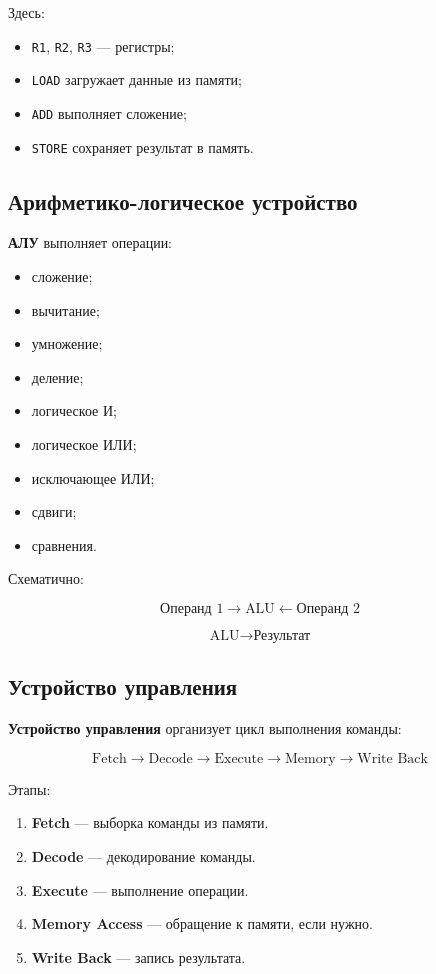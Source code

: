 \documentclass[12pt,a4paper]{article}
\theoremstyle{remark}
\begin{document}
Здесь:
\begin{itemize}
    \item \texttt{R1}, \texttt{R2}, \texttt{R3} --- регистры;
    \item \texttt{LOAD} загружает данные из памяти;
    \item \texttt{ADD} выполняет сложение;
    \item \texttt{STORE} сохраняет результат в память.
\end{itemize}

\subsection{Арифметико-логическое устройство}

\textbf{АЛУ} выполняет операции:
\begin{itemize}
    \item сложение;
    \item вычитание;
    \item умножение;
    \item деление;
    \item логическое И;
    \item логическое ИЛИ;
    \item исключающее ИЛИ;
    \item сдвиги;
    \item сравнения.
\end{itemize}

Схематично:

\[
\boxed{\text{Операнд 1}}
\longrightarrow
\boxed{\text{ALU}}
\longleftarrow
\boxed{\text{Операнд 2}}
\]

\[
\boxed{\text{ALU}}
\longrightarrow
\boxed{\text{Результат}}
\]

\subsection{Устройство управления}

\textbf{Устройство управления} организует цикл выполнения команды:

\[
\boxed{\text{Fetch}}
\rightarrow
\boxed{\text{Decode}}
\rightarrow
\boxed{\text{Execute}}
\rightarrow
\boxed{\text{Memory}}
\rightarrow
\boxed{\text{Write Back}}
\]

Этапы:
\begin{enumerate}
    \item \textbf{Fetch} --- выборка команды из памяти.
    \item \textbf{Decode} --- декодирование команды.
    \item \textbf{Execute} --- выполнение операции.
    \item \textbf{Memory Access} --- обращение к памяти, если нужно.
    \item \textbf{Write Back} --- запись результата.
\end{enumerate}
\end{document}
